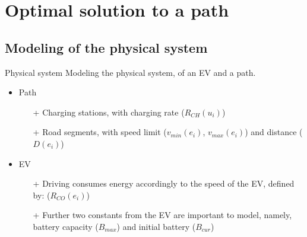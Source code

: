 \section{Optimal solution to a path}
\subsection{Modeling of the physical system}
\begin{frame}{Physical system}
Modeling the physical system, of an EV and a path.
\begin{figure}[!htb]
\centering
\end{figure} 
\begin{itemize}
\item Path
\begin{itemize}
\item[+] Charging stations, with charging rate ($R_{CH}(u_i)$)
\item[+] Road segments, with speed limit ($v_{min}(e_i)$, $v_{max}(e_i)$) and distance ($D(e_i)$) 
\end{itemize}
\item EV
\begin{itemize}
\item[+] Driving consumes energy accordingly to the speed of the EV, defined by: ($R_{CO}(e_i)$)
\item[+] Further two constants from the EV are important to model, namely, battery capacity ($B_{max}$) and initial battery ($B_{cur}$)
\end{itemize}
\end{itemize} 
\end{frame}

